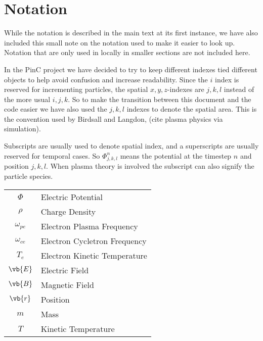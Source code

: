 \section{Notation}
  While the notation is described in the main text at its first instance, we have also included
  this small note on the notation used to make it easier to look up.
  Notation that are only used in locally in smaller sections are not included here.

  In the PinC project we have decided to try to keep different indexes tied different
  objects to help avoid confusion and increase readability. Since the \(i\) index is
  reserved for incrementing particles, the spatial \(x,y,z\)-indexes are \(j,k,l\) instead of the
  more usual \(i,j,k\). So to make the transition between this document and the code
  easier we have also used the \(j,k,l\) indexes to denote the spatial area.
  This is the convention used by Birdsall and Langdon, (cite plasma physics via simulation).


  Subscripts are usually used to denote spatial index, and a superscripts are usually
  reserved for temporal cases. So \( \Phi^n_{j,k,l} \) means the potential at
  the timestep \(n\) and position \(j,k,l\). When plasma theory is involved the subscript
  can also signify the particle species.


  \begin{centering}
    \begin{tabular}{c |l}
      \(\Phi\) & Electric Potential
      \\
      \(\rho\) & Charge Density
      \\
      \(\omega_{pe}\) & Electron Plasma Frequency
      \\
      \(\omega_{ce}\) & Electron Cycletron Frequency
      \\
      \(T_e\)   & Electron Kinetic Temperature
      \\
      \(\vb{E} \)   & Electric Field
      \\
      \(\vb{B}\)    & Magnetic Field
      \\
      \(\vb{r} \)   & Position
      \\
      \(m \)        & Mass
      \\
      \(T \)        & Kinetic Temperature
    \end{tabular}
  \end{centering}
